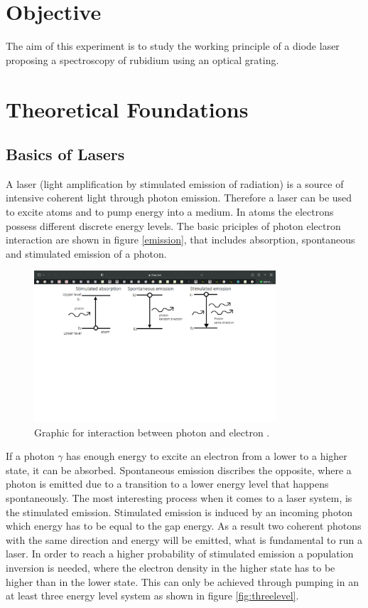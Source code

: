 \section{Objective}
The aim of this experiment is to study the working principle of a diode laser proposing a spectroscopy of rubidium using an optical grating.


\section{Theoretical Foundations}
\subsection{Basics of Lasers}

\noindent
A laser (light amplification by stimulated emission of radiation) is a source of intensive coherent light through photon emission.
Therefore a laser can be used to excite atoms and to pump energy into a medium.
In atoms the electrons possess different discrete energy levels.
The basic priciples of photon electron interaction are shown in figure \ref{emission},
that includes absorption, spontaneous and stimulated emission of a photon.


\begin{figure}
  \centering
  \includegraphics[width=9cm]{emission.pdf}
  \caption{Graphic for interaction between photon and electron \cite{emissiongraphic}.}
  \label{fig:emission}
\end{figure}

\noindent
If a photon $\gamma$ has enough energy to excite an electron from a lower to a higher state, it can be absorbed.
Spontaneous emission discribes the opposite, where a photon is emitted due to a transition to a lower energy level that happens spontaneously.
The  most interesting process when it comes to a laser system, is the stimulated emission.
Stimulated emission is induced by an incoming photon which energy has to be equal to the gap energy.
As a result two coherent photons with the same direction and energy will be emitted, what is fundamental to run a laser.
In order to reach a higher probability of stimulated emission a population inversion is needed, where the electron density in the higher state has to be higher than in the lower state.
This can only be achieved through pumping in an at least three energy level system as shown in figure \ref{fig:threelevel}.


